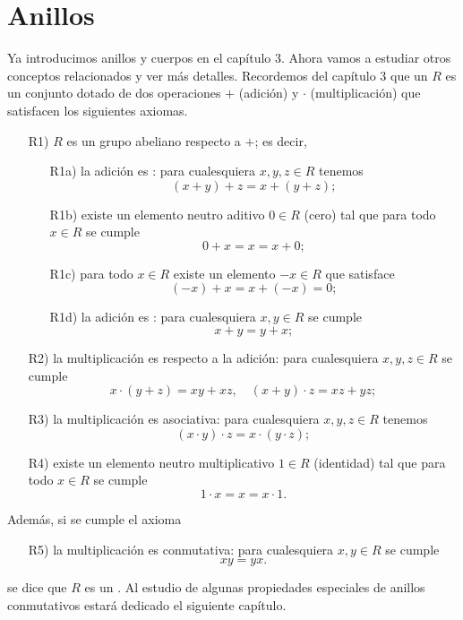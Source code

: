 \chapter{Anillos}

Ya introducimos anillos y cuerpos en el capítulo 3. Ahora vamos a estudiar otros
conceptos relacionados y ver más detalles. Recordemos del capítulo 3 que
un  $R$ es un conjunto dotado de dos operaciones $+$ (adición)
y $\cdot$ (multiplicación) que satisfacen los siguientes axiomas.

\begin{enumerate}
\item[R1)] $R$ es un grupo abeliano respecto a $+$; es decir,

\begin{itemize}
\item[R1a)] la adición es : para cualesquiera $x,y,z\in R$
  tenemos
  $$(x+y)+z = x+(y+z);$$

\item[R1b)] existe un elemento neutro aditivo $0\in R$ (cero) tal que para todo
  $x\in R$ se cumple
  $$0+x = x = x+0;$$

\item[R1c)] para todo $x\in R$ existe un elemento  $-x\in R$ que
  satisface
  $$(-x) + x = x + (-x) = 0;$$

\item[R1d)] la adición es : para cualesquiera $x,y\in R$ se
  cumple
  $$x+y = y+x;$$
\end{itemize}

\item[R2)] la multiplicación es 
  respecto a la adición: para cualesquiera $x,y,z\in R$ se cumple
  $$x\cdot (y+z) = xy + xz, \quad (x+y)\cdot z = xz + yz;$$

\item[R3)] la multiplicación es asociativa: para cualesquiera $x,y,z\in R$
  tenemos
  $$(x\cdot y)\cdot z = x\cdot (y\cdot z);$$

\item[R4)] existe un elemento neutro multiplicativo $1\in R$ (identidad) tal que
  para todo $x\in R$ se cumple
  $$1\cdot x = x = x\cdot 1.$$
\end{enumerate}

Además, si se cumple el axioma
\begin{enumerate}
\item[R5)] la multiplicación es conmutativa: para cualesquiera $x,y\in R$
  se cumple
  $$xy = yx.$$
\end{enumerate}
se dice que $R$ es un . Al estudio de algunas
propiedades especiales de anillos conmutativos estará dedicado el siguiente
capítulo.

